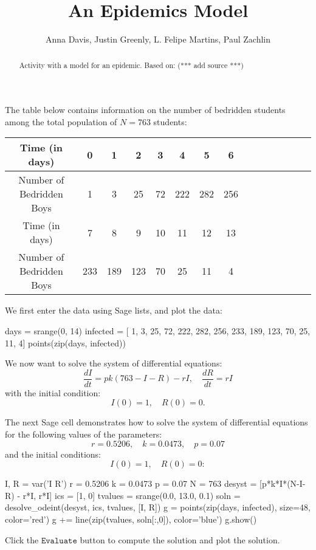 \documentclass{ximera}
\title{An Epidemics Model}
\author{Anna Davis, Justin Greenly, L. Felipe Martins, Paul Zachlin}
\begin{document}
\begin{abstract}
Activity with a model for an epidemic. Based on: (*** add source ***)
\end{abstract}

\maketitle

The table below contains information on the number of bedridden students among the total population of $N=763$ students:

\begin{tabular}{|c|c|c|c|c|c|c|c|c|c|c|c|c|c|c|}\hline
Time (in days)           & 0 & 1 &  2 &  3 &  4 &    5 &   6  \\\hline
Number of Bedridden Boys & 1 & 3 & 25 & 72 & 222 & 282 & 256 \\\hline\hline
Time (in days) &             7 &   8 &   9 & 10 & 11 & 12 & 13\\\hline
Number of Bedridden Boys & 233 & 189 & 123 & 70 & 25 & 11 &  4\\\hline
\end{tabular}

We first enter the data using Sage lists, and plot the data:

\begin{sageCell}
days = srange(0, 14)
infected = [  1,   3,  25, 72, 222, 282, 256, 
            233, 189, 123, 70,  25,  11,   4]
points(zip(days, infected))
\end{sageCell}

We now want to solve the system of differential equations:
\[
\frac{dI}{dt}=pk(763-I-R)-rI,\quad\frac{dR}{dt}=rI
\]
with the initial condition:
\[
I(0)=1,\quad R(0)=0.
\]

The next Sage cell demonstrates how to solve the system of differential equations for the following values of the parameters:
\[
r = 0.5206,\quad k = 0.0473,\quad p = 0.07
\]
and the initial conditions:
\[
I(0)=1,\quad R(0)=0:
\]

\begin{sageCell}
I, R = var('I R')
r = 0.5206
k = 0.0473
p = 0.07
N = 763
desyst = [p*k*I*(N-I-R) - r*I, r*I]
ics = [1, 0]
tvalues = srange(0.0, 13.0, 0.1)
soln = desolve_odeint(desyst, ics, tvalues, [I, R])
g = points(zip(days, infected), 
           size=48, color='red')
g += line(zip(tvalues, soln[:,0]), 
          color='blue')
g.show()
\end{sageCell}

Click the $\mathtt{Evaluate}$ button to compute the solution and plot the solution.
\end{document}
